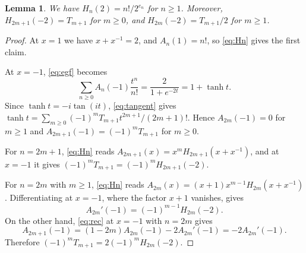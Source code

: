 \documentclass{amsart}
\newtheorem{lemma}[theorem]{Lemma}
\theoremstyle{remark}
\numberwithin{equation}{section}
\begin{document}
\begin{lemma}\label{lem:values}
We have $H_n(2)=n!/2^{e_n}$ for $n\ge 1$. Moreover,
$H_{2m+1}(-2)=T_{m+1}$ for $m\ge 0$, and $H_{2m}(-2)=T_{m+1}/2$ for
$m\ge 1$.
\end{lemma}

\begin{proof}
At $x=1$ we have $x+x^{-1}=2$, and $A_n(1)=n!$, so \eqref{eq:Hn} gives the
first claim.

At $x=-1$, \eqref{eq:egf} becomes
\[
\sum_{n\ge 0}A_n(-1)\frac{t^n}{n!}=\frac{2}{1+e^{-2t}}=1+\tanh t.
\]
Since $\tanh t=-i\tan(it)$, \eqref{eq:tangent} gives
$\tanh t=\sum_{m\ge 0}(-1)^mT_{m+1}t^{2m+1}/(2m+1)!$. Hence
$A_{2m}(-1)=0$ for $m\ge 1$ and $A_{2m+1}(-1)=(-1)^mT_{m+1}$ for $m\ge 0$.

For $n=2m+1$, \eqref{eq:Hn} reads $A_{2m+1}(x)=x^mH_{2m+1}(x+x^{-1})$, and at
$x=-1$ it gives $(-1)^mT_{m+1}=(-1)^mH_{2m+1}(-2)$.

For $n=2m$ with $m\ge 1$, \eqref{eq:Hn} reads
$A_{2m}(x)=(x+1)x^{m-1}H_{2m}(x+x^{-1})$. Differentiating at $x=-1$, where the
factor $x+1$ vanishes, gives
\[
A_{2m}'(-1)=(-1)^{m-1}H_{2m}(-2).
\]
On the other hand, \eqref{eq:rec} at $x=-1$ with $n=2m$ gives
\[
A_{2m+1}(-1)=(1-2m)A_{2m}(-1)-2A_{2m}'(-1)=-2A_{2m}'(-1).
\]
Therefore
$(-1)^mT_{m+1}=2(-1)^mH_{2m}(-2)$.
\end{proof}
\end{document}
